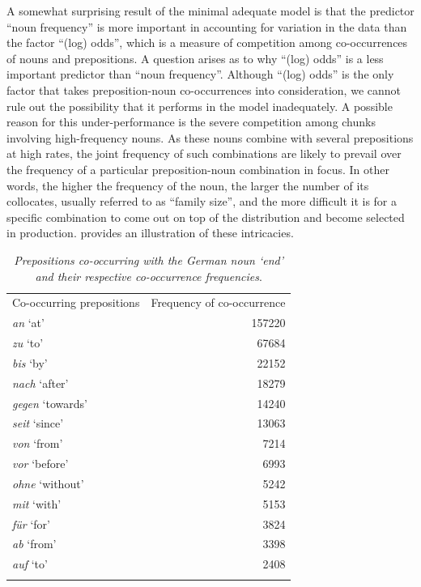 A somewhat surprising result of the minimal adequate model is that the predictor “noun frequency” is more important in accounting for variation in the data than the factor “(log) odds”, which is a measure of competition among co-occurrences of nouns and prepositions. A question arises as to why “(log) odds” is a less important predictor than “noun frequency”. Although “(log) odds” is the only factor that takes preposition-noun co-occurrences into consideration, we cannot rule out the possibility that it  performs in the model inadequately. A possible reason for this under-performance is the severe competition among chunks involving high-frequency nouns. As these nouns combine with several prepositions at high rates, the joint frequency of such combinations are likely to prevail over the frequency of a particular preposition-noun combination in focus. In other words, the higher the frequency of the noun, the larger the number of its collocates, usually referred to as “family size”, and the more difficult it is for a specific combination to come out on top of the distribution and become selected in production.  provides an illustration of these intricacies. 

\begin{table}
\centering
	\begin{tabular}{lr}
		\midrule
		\addlinespace[2mm]
		Co-occurring prepositions & Frequency of co-occurrence\\ 
		\addlinespace[2mm] \midrule
		\addlinespace[2mm]
		\textit{an} `at' & 157220 \\
		\textit{zu} `to' & 67684 \\
		\textit{bis} `by' & 22152 \\
		\textit{nach} `after' & 18279 \\
		\textit{gegen} `towards' & 14240 \\
		\textit{seit} `since' & 13063 \\
		\textit{von} `from' & 7214 \\
		\textit{vor} `before' & 6993 \\
		\textit{ohne} `without' & 5242 \\
		\textit{mit} `with' & 5153 \\
		\textit{für} `for' & 3824 \\
		\textit{ab} `from' & 3398 \\
		\textit{auf} `to' & 2408 \\
		\addlinespace[2mm]
		\midrule
	\end{tabular}
	\caption{\textit{Prepositions co-occurring with the German noun  \itshape `end' and their respective co-occurrence frequencies}.} \label{tab:5:6}
\end{table}


